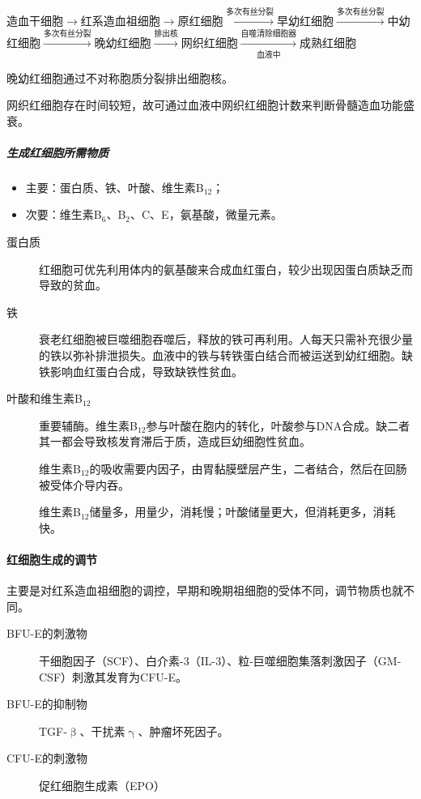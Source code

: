 造血干细胞$\longrightarrow$红系造血祖细胞$\longrightarrow$原红细胞$\xrightarrow{\text{多次有丝分裂}}$早幼红细胞$\xrightarrow{\text{多次有丝分裂}}$中幼红细胞$\xrightarrow{\text{多次有丝分裂}}$晚幼红细胞$\xrightarrow{\text{排出核}}$网织红细胞$\xrightarrow[\text{血液中}]{\text{自噬清除细胞器}}$成熟红细胞

晚幼红细胞通过不对称胞质分裂排出细胞核。

网织红细胞存在时间较短，故可通过血液中网织红细胞计数来判断骨髓造血功能盛衰。

\subparagraph{生成红细胞所需物质}

\begin{itemize}
	\item 主要：蛋白质、铁、叶酸、维生素B$_{12}$；
	\item 次要：维生素B$_{6}$、B$_{2}$、C、E，氨基酸，微量元素。
\end{itemize}

\begin{description}
	\item[蛋白质] 红细胞可优先利用体内的氨基酸来合成血红蛋白，较少出现因蛋白质缺乏而导致的贫血。
	\item[铁] 衰老红细胞被巨噬细胞吞噬后，释放的铁可再利用。人每天只需补充很少量的铁以弥补排泄损失。血液中的铁与转铁蛋白结合而被运送到幼红细胞。缺铁影响血红蛋白合成，导致缺铁性贫血。
	\item[叶酸和维生素B$_{12}$] 重要辅酶。维生素B$_{12}$参与叶酸在胞内的转化，叶酸参与DNA合成。缺二者其一都会导致核发育滞后于质，造成巨幼细胞性贫血。

	维生素B$_{12}$的吸收需要内因子，由胃黏膜壁层产生，二者结合，然后在回肠被受体介导内吞。

	维生素B$_{12}$储量多，用量少，消耗慢；叶酸储量更大，但消耗更多，消耗快。
\end{description}

\paragraph{红细胞生成的调节}

主要是对红系造血祖细胞的调控，早期和晚期祖细胞的受体不同，调节物质也就不同。

\begin{description}
	\item[BFU-E的刺激物] 干细胞因子（SCF）、白介素-3（IL-3）、粒-巨噬细胞集落刺激因子（GM-CSF）刺激其发育为CFU-E。
	\item[BFU-E的抑制物] TGF-$\upbeta$、干扰素$\upgamma$、肿瘤坏死因子。
	\item[CFU-E的刺激物] 促红细胞生成素（EPO）
\end{description}

